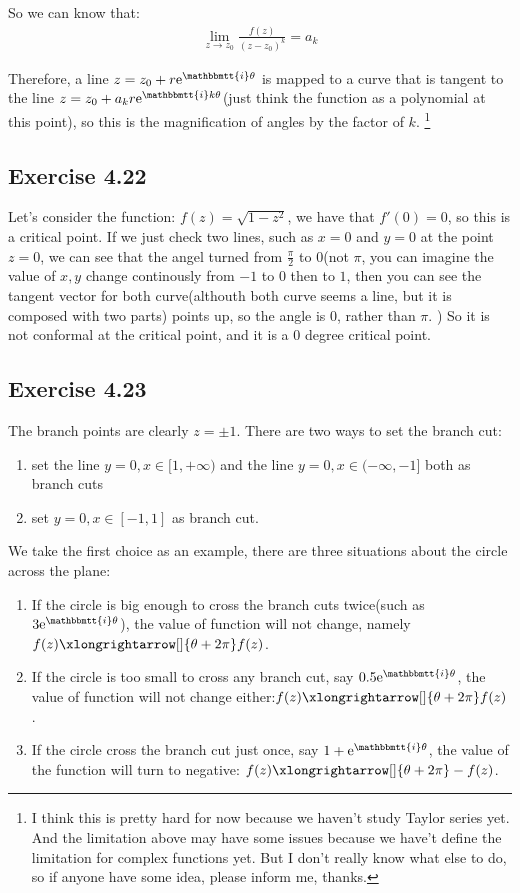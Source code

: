 \documentclass[]{ctexart}
\newcommand{\mi}{\mathbbmtt{i}}
\newcommand{\me}{\mathrm{e}}
\begin{document}
		So we can know that:
			\begin{equation*}
			\begin{aligned}
				\lim_{z\rightarrow z_0}\frac{f(z)}{(z-z_0)^k}=a_k
			\end{aligned}
			\end{equation*}
				
		Therefore, a line $z=z_0+r\me ^{\mi \theta}$ is mapped to a curve that is tangent to the line $z=z_0+a_kr\me ^{\mi k \theta }$(just think the function as a polynomial at this point), so this is the magnification of angles by the factor of $k$. \footnote{I think this is pretty hard for now because we haven't study Taylor series yet. And the limitation above may have some issues because we have't define the limitation for complex functions yet. But I don't really know what else to do, so if anyone have some idea, please inform me, thanks.}
			
	\subsection{Exercise 4.22}	
		Let's consider the function: $f(z)=\sqrt{1-z^2}$, we have that $f'(0)=0$, so this is a critical point. If we just check two lines, such as $x=0$ and $y=0$ at the point $z=0$, we can see that the angel turned from $\frac{\pi }{2}$ to $0$(not $\pi $, you can imagine the value of $x,y$ change continously from $-1$ to $0$ then to $1$, then you can see the tangent vector for both curve(althouth both curve seems a line, but it is composed with two parts) points up, so the angle is $0$, rather than $\pi$. ) So it is not conformal at the critical point, and it is a $0$ degree critical point. 
		
	\subsection{Exercise 4.23}
		The branch points are clearly $z=\pm 1$. There are two ways to set the branch cut: 
			\begin{enumerate}
				\item set the line $y=0, x\in [1,+\infty)$ and the line $y=0, x\in (-\infty,-1]$ both as branch cuts
				\item set $y=0, x\in [-1,1]$ as branch cut.
			\end{enumerate}
		
		We take the first choice as an example, there are three situations about the circle across the plane:
			\begin{enumerate}
				\item If the circle is big enough to cross the branch cuts twice(such as $3\me ^{\mi \theta}$), the value of function will not change, namely $f(z)\xlongrightarrow[]{\theta +2\pi} f(z)$.
				\item If the circle is too small to cross any branch cut, say $0.5 \me ^{\mi \theta}$, the value of function will not change either:$f(z)\xlongrightarrow[]{\theta +2\pi} f(z)$.
				\item If the circle cross the branch cut just once, say $1+\me ^{\mi \theta}$, the value of the function will turn to negative: $f(z)\xlongrightarrow[]{\theta +2\pi} -f(z)$.
			\end{enumerate}
	
\end{document}
